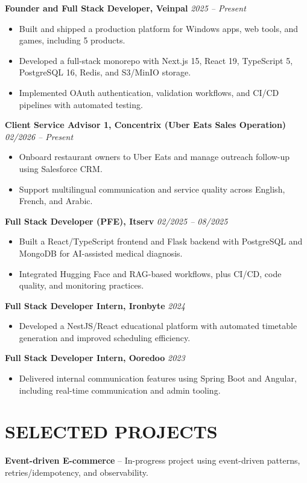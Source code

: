 \documentclass[10pt,a4paper]{article}
\begin{document}
\textbf{Founder and Full Stack Developer, Veinpal} \hfill \textit{2025 -- Present}
\begin{itemize}
  \item Built and shipped a production platform for Windows apps, web tools, and games, including 5 products.
  \item Developed a full-stack monorepo with Next.js 15, React 19, TypeScript 5, PostgreSQL 16, Redis, and S3/MinIO storage.
  \item Implemented OAuth authentication, validation workflows, and CI/CD pipelines with automated testing.
\end{itemize}

\textbf{Client Service Advisor 1, Concentrix (Uber Eats Sales Operation)} \hfill \textit{02/2026 -- Present}
\begin{itemize}
  \item Onboard restaurant owners to Uber Eats and manage outreach follow-up using Salesforce CRM.
  \item Support multilingual communication and service quality across English, French, and Arabic.
\end{itemize}

\textbf{Full Stack Developer (PFE), Itserv} \hfill \textit{02/2025 -- 08/2025}
\begin{itemize}
  \item Built a React/TypeScript frontend and Flask backend with PostgreSQL and MongoDB for AI-assisted medical diagnosis.
  \item Integrated Hugging Face and RAG-based workflows, plus CI/CD, code quality, and monitoring practices.
\end{itemize}

\textbf{Full Stack Developer Intern, Ironbyte} \hfill \textit{2024}
\begin{itemize}
  \item Developed a NestJS/React educational platform with automated timetable generation and improved scheduling efficiency.
\end{itemize}

\textbf{Full Stack Developer Intern, Ooredoo} \hfill \textit{2023}
\begin{itemize}
  \item Delivered internal communication features using Spring Boot and Angular, including real-time communication and admin tooling.
\end{itemize}

\section*{SELECTED PROJECTS}
\textbf{Event-driven E-commerce} -- In-progress project using event-driven patterns, retries/idempotency, and observability.
\end{document}
